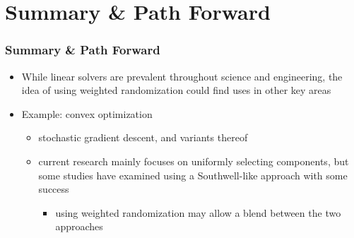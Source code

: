 \documentclass{beamer}
\begin{document}
\section{Summary \& Path Forward}

\begin{frame}
	\frametitle{Summary \& Path Forward}
	\begin{itemize}
		\item While linear solvers are prevalent throughout science and engineering, the idea of using weighted randomization could find uses in other key areas
		\item Example: convex optimization 
			\begin{itemize}
				\item stochastic gradient descent, and variants thereof
				\item current research mainly focuses on uniformly selecting components, but some studies have examined using a Southwell-like approach with some success
					\begin{itemize}
						\item using weighted randomization may allow a blend between the two approaches
					\end{itemize}
			\end{itemize}
	\end{itemize}
\end{frame}
\end{document}
